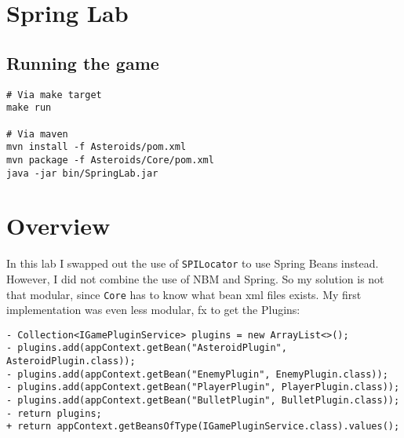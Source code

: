 \section{Spring Lab}

\subsection{Running the game}
\begin{verbatim}
# Via make target
make run

# Via maven
mvn install -f Asteroids/pom.xml
mvn package -f Asteroids/Core/pom.xml
java -jar bin/SpringLab.jar
\end{verbatim}

\section{Overview}
In this lab I swapped out the use of \texttt{SPILocator} to use Spring Beans
instead. However, I did not combine the use of NBM and Spring. So my solution is
not that modular, since \texttt{Core} has to know what bean xml files exists.
My first implementation was even less modular, fx to get the Plugins:

\begin{verbatim}
- Collection<IGamePluginService> plugins = new ArrayList<>();
- plugins.add(appContext.getBean("AsteroidPlugin", AsteroidPlugin.class));
- plugins.add(appContext.getBean("EnemyPlugin", EnemyPlugin.class));
- plugins.add(appContext.getBean("PlayerPlugin", PlayerPlugin.class));
- plugins.add(appContext.getBean("BulletPlugin", BulletPlugin.class));
- return plugins;
+ return appContext.getBeansOfType(IGamePluginService.class).values();
\end{verbatim}

